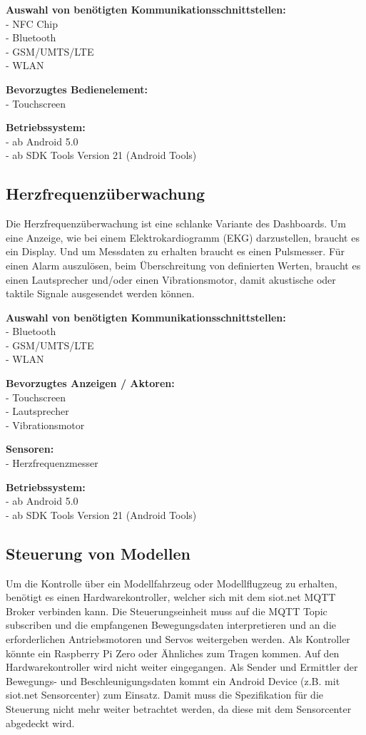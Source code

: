 \textbf{Auswahl von benötigten Kommunikationsschnittstellen:}\\
- \gls{NFC} Chip\\
- Bluetooth\\
- \gls{GSM}/\gls{UMTS}/\gls{LTE}\\
- \gls{WLAN}

\textbf{Bevorzugtes Bedienelement:}\\
- Touchscreen

\textbf{Betriebssystem:}\\
- ab Android 5.0\\
- ab \gls{SDK} Tools Version 21 (Android Tools)

\subsection{Herzfrequenzüberwachung}
Die Herzfrequenzüberwachung ist eine schlanke Variante des Dashboards. Um eine Anzeige, wie bei einem Elektrokardiogramm (\gls{EKG}) darzustellen, braucht es ein Display. Und um Messdaten zu erhalten braucht es einen Pulsmesser. Für einen Alarm auszulösen, beim Überschreitung von definierten Werten, braucht es einen Lautsprecher und/oder einen Vibrationsmotor, damit akustische oder taktile Signale ausgesendet werden können.

\textbf{Auswahl von benötigten Kommunikationsschnittstellen:}\\
- Bluetooth\\
- \gls{GSM}/\gls{UMTS}/\gls{LTE}\\
- \gls{WLAN}

\textbf{Bevorzugtes Anzeigen / Aktoren:}\\
- Touchscreen\\
- Lautsprecher\\
- Vibrationsmotor

\textbf{Sensoren:}\\
- Herzfrequenzmesser

\textbf{Betriebssystem:}\\
- ab Android 5.0\\
- ab \gls{SDK} Tools Version 21 (Android Tools)

\subsection{Steuerung von Modellen}
Um die Kontrolle über ein Modellfahrzeug oder Modellflugzeug zu erhalten, benötigt es einen Hardwarekontroller, welcher sich mit dem siot.net \gls{MQTT} Broker verbinden kann. Die Steuerungseinheit muss auf die \gls{MQTT} Topic subscriben und die empfangenen Bewegungsdaten interpretieren und an die erforderlichen Antriebsmotoren und Servos weitergeben werden. Als Kontroller könnte ein Raspberry Pi Zero oder Ähnliches zum Tragen kommen. Auf den Hardwarekontroller wird nicht weiter eingegangen. Als Sender und Ermittler der Bewegungs- und Beschleunigungsdaten kommt ein Android Device (z.B. mit siot.net Sensorcenter) zum Einsatz. Damit muss die Spezifikation für die Steuerung nicht mehr weiter betrachtet werden, da diese mit dem Sensorcenter abgedeckt wird.

